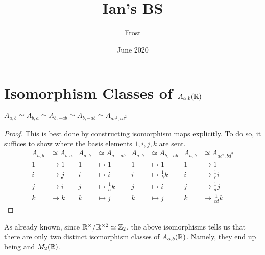\documentclass{article}
\title{Ian's BS}
\author{Frost}
\date{June 2020}
\begin{document}
\maketitle
\section{Isomorphism Classes of $A_{a,b}(\protect\mathbb{R})$}

\begin{theorem}
$A_{a,b} \simeq A_{b,a} \simeq A_{b, -ab} \simeq A_{b,-ab} \simeq A_{ac^2, bd^2}$
\end{theorem}

\begin{proof}
This is best done by constructing isomorphism maps explicitly. To do so, it suffices to show where the basis elements $1,i,j,k$ are sent.
\begin{align*}
    A_{a,b} &\simeq A_{b,a} & A_{a,b} &\simeq A_{a,-ab} & A_{a,b} &\simeq A_{b,-ab} & A_{a,b} &\simeq A_{ac^2,bd^2} \\
    1 &\mapsto 1 & 1 &\mapsto 1 & 1 &\mapsto 1 & 1 &\mapsto 1\\
    i &\mapsto j & i &\mapsto i & i &\mapsto \frac{1}{b}k & i &\mapsto \frac{1}{c}i\\
    j &\mapsto i & j &\mapsto \frac{1}{a}k & j &\mapsto i & j &\mapsto \frac{1}{d}j\\
    k &\mapsto k & k &\mapsto j & k &\mapsto j & k &\mapsto \frac{1}{cd}k
\end{align*}
\end{proof}

As already known, since $\protect\mathbb{R}^\times/ \protect\mathbb{R}^{\times2} \simeq \protect\mathbb{Z}_2$, the above isomorphisms tells us that there are only two distinct isomorphism classes of $A_{a,b}(\protect\mathbb{R})$. Namely, they end up being \bH and $M_2(\protect\mathbb{R})$.
\end{document}
